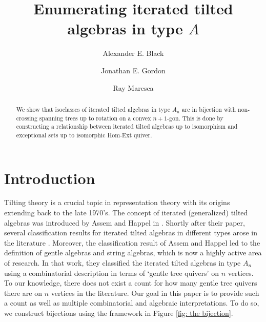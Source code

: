 \documentclass[12pt]{amsart}
\title{Enumerating iterated tilted algebras in type $A$}
\author{Alexander E. Black}
\author{Jonathan E. Gordon}
\author{Ray Maresca}
\theoremstyle{definition}
\theoremstyle{remark}
\numberwithin{equation}{section}
\begin{document}
\begin{abstract}
 We show that isoclasses of iterated tilted algebras in type $A_n$ are in bijection with non-crossing spanning trees up to rotation on a convex $n+1$-gon. This is done by constructing a relationship between iterated tilted algebras up to isomorphism and exceptional sets up to isomorphic Hom-Ext quiver. 
\end{abstract}

\maketitle

\tableofcontents

\section*{Introduction}\label{sec0}
Tilting theory is a crucial topic in representation theory with its origins extending back to the late 1970's. The concept of iterated (generalized) tilted algebras was introduced by Assem and Happel in \cite{assem1981generalized}. Shortly after their paper, several classification results for iterated tilted algebras in different types arose in the literature \cite{assem1983iterated, assem1987iterated, happel1987iterated}. Moreover, the classification result of Assem and Happel led to the definition of gentle algebras and string algebras, which is now a highly active area of research. In that work, they classified the iterated tilted algebras in type $A_n$ using a combinatorial description in terms of `gentle tree quivers' on $n$ vertices. To our knowledge, there does not exist a count for how many gentle tree quivers there are on $n$ vertices in the literature. Our goal in this paper is to provide such a count as well as multiple combinatorial and algebraic interpretations. To do so, we construct bijections using the framework in Figure \ref{fig: the bijection}.
\end{document}
